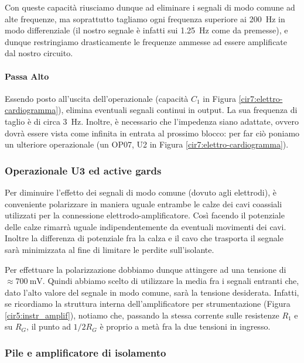 Con queste capacità riusciamo dunque ad eliminare i segnali di modo comune ad alte frequenze, ma soprattutto tagliamo ogni frequenza superiore ai \SI{200}{\Hz} in modo differenziale (il nostro segnale è infatti sui \SI{1.25}{\Hz} come da premesse), e dunque restringiamo drasticamente le frequenze ammesse ad essere amplificate dal nostro circuito.

\paragraph*{Passa Alto}
Essendo posto all'uscita dell'operazionale (capacità $C_1$ in Figura \ref{cir7:elettro-cardiogramma}), elimina eventuali segnali continui in output. La sua frequenza di taglio è di circa \SI{3}{\Hz}. Inoltre, è necessario che l'impedenza siano adattate, ovvero dovrà essere vista come infinita in entrata al prossimo blocco: per far ciò poniamo un ulteriore operazionale (un OP07, U2 in Figura \ref{cir7:elettro-cardiogramma}).

\subsubsection*{Operazionale U3 ed active gards}

Per diminuire l'effetto dei segnali di modo comune (dovuto agli elettrodi), è conveniente polarizzare in maniera uguale entrambe le calze dei cavi coassiali utilizzati per la connessione elettrodo-amplificatore. Così facendo il potenziale delle calze rimarrà uguale indipendentemente da eventuali movimenti dei cavi. Inoltre la differenza di potenziale fra la calza e il cavo che trasporta il segnale sarà minimizzata al fine di limitare le perdite sull'isolante.

Per effettuare la polarizzazione dobbiamo dunque attingere ad una tensione di $\approx \SI{700}{\milli\volt}$. Quindi abbiamo scelto di utilizzare la media fra i segnali entranti che, dato l'alto valore del segnale in modo comune, sarà la tensione desiderata. Infatti, se ricordiamo la struttura interna dell'amplificatore per strumentazione (Figura \ref{cir5:instr_amplif}), notiamo che, passando la stessa corrente sulle resistenze $R_1$ e su $R_G$, il punto ad $1/2 R_G$ è proprio a metà fra la due tensioni in ingresso.

\subsubsection*{Pile e amplificatore di isolamento}

